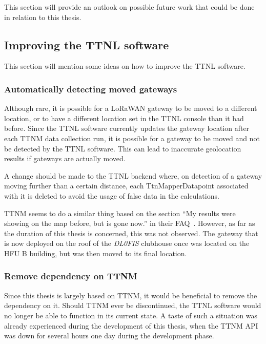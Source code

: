 This section will provide an outlook on possible future work that could be done in relation to this thesis.

\subsection{Improving the \acf{TTNL} software}

This section will mention some ideas on how to improve the \ac{TTNL} software.

\subsubsection{Automatically detecting moved gateways}

Although rare, it is possible for a \ac{LoRaWAN} gateway to be moved to a different location, or to have a different location set in the \ac{TTNL} console than it had before.
Since the \ac{TTNL} software currently updates the gateway location after each \ac{TTNM} data collection run, it is possible for a gateway to be moved and not be detected by the \ac{TTNL} software.
This can lead to inaccurate geolocation results if gateways are actually moved.

A change should be made to the \ac{TTNL} backend where, on detection of a gateway moving further than a certain distance, each TtnMapperDatapoint associated with it is deleted to avoid the usage of false data in the calculations.

\ac{TTNM} seems to do a similar thing based on the section ``My results were showing on the map before, but is gone now.'' in their FAQ~\cite{ttn_mapper_faq_nodate}.
However, as far as the duration of this thesis is concerned, this was not observed.
The gateway that is now deployed on the roof of the \emph{DL0FIS} clubhouse once was located on the \ac{HFU} B building, but was then moved to its final location.

\subsubsection{Remove dependency on \acl{TTNM}}

Since this thesis is largely based on \ac{TTNM}, it would be beneficial to remove the dependency on it.
Should \ac{TTNM} ever be discontinued, the \ac{TTNL} software would no longer be able to function in its current state.
A taste of such a situation was already experienced during the development of this thesis, when the \ac{TTNM} \ac{API} was down for several hours one day during the development phase.

